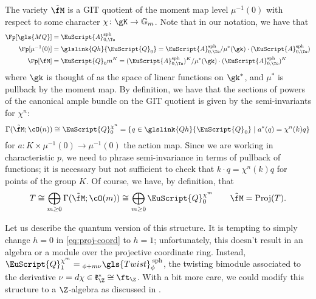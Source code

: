 The variety $\tilde{\fM}$ is a GIT quotient of the moment map level $\mu^{-1}(0)$ with respect to some character $\chi\colon \gK\to \mathbb{G}_m$. Note that in our notation, we have that 
  \begin{align*}
    \Fp[\gls{MQ}]&=\EuScript{A}_{0,\To}^{\operatorname{sph}}\\
    \Fp[\mu^{-1}(0)]&=\glslink{Qh}{\EuScript{Q}_0}=\EuScript{A}_{0,\To}^{\operatorname{sph}}/\mu^*(\gk)\cdot(\EuScript{A}_{0,\To}^{\operatorname{sph}})\\
    \Fp[\fM]&=\EuScript{Q}_0m^K= (\EuScript{A}_{0,\To}^{\operatorname{sph}})^K/\mu^*(\gk)\cdot(\EuScript{A}_{0,\To}^{\operatorname{sph}})^K
  \end{align*}
  where $\gk$ is thought of as the space of linear functions on $\gk^*$, and $\mu^*$ is pullback by the moment map.    
  By definition, we have that the sections of powers of the canonical ample bundle on the GIT quotient is given by the semi-invariants for $\chi^n$:
  \begin{equation*}
    \Gamma(\tilde{\fM};\cO(n))\cong \EuScript{Q}_0^{\chi^n} =\{q\in \glslink{Qh}{\EuScript{Q}_0}\mid a^*( q)=\chi^n(k)q \} 
  \end{equation*}
  for $a\colon K\times \mu^{-1}(0)\to \mu^{-1}(0) $ the action map. Since we are working in characteristic $p$, we need to phrase semi-invariance in terms of pullback of functions; it is necessary but not sufficient to check that $k\cdot q=\chi^n(k)q$ for points of the group $K$.  Of course, we have, by definition, that
  \begin{equation}
T\cong \bigoplus_{m\geq 0}\Gamma(\tilde{\fM};\cO(m))\cong \bigoplus_{m\geq 0}\EuScript{Q}_0^{\chi^m}\qquad \tilde{\fM}=\operatorname{Proj}(T).\label{eq:proj-coord}
\end{equation}

  Let us describe the quantum version of this structure.  It is tempting to simply change $h=0$ in \eqref{eq:proj-coord} to $h=1$; unfortunately, this doesn't result in an algebra
  or a module over the projective coordinate ring.  Instead, $\EuScript{Q}_1^{\chi^m}={}_{\phi+m\nu}\gls{Twist}^{\:\operatorname{sph}}_\phi$, the twisting bimodule associated to the derivative $\nu=d\chi\in \mathfrak{k}_\Z^*\cong \ft_\Z$.   With a bit more care, we could modify this structure to a $\Z$-algebra as discussed in \cite[\S 5.5]{BLPWquant}.

